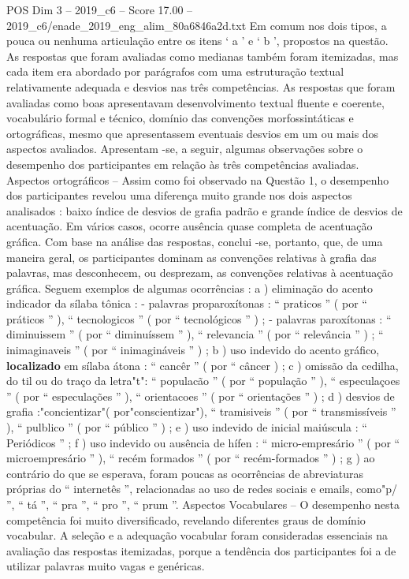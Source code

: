 \begin{textsample}{POS Dim 3 – 2019\_c6 – Score 17.00 – 2019\_c6/enade\_2019\_eng\_alim\_80a6846a2d.txt}
Em comum nos dois tipos, a pouca ou nenhuma articulação entre os itens ‘ a ’ e ‘ b ’, propostos na questão.
As respostas que foram avaliadas como medianas também foram itemizadas, mas cada item era abordado por parágrafos com uma estruturação textual relativamente adequada e desvios nas três competências.
As respostas que foram avaliadas como boas apresentavam desenvolvimento textual fluente e coerente, vocabulário formal e técnico, domínio das convenções morfossintáticas e ortográficas, mesmo que apresentassem eventuais desvios em um ou mais dos aspectos avaliados.
Apresentam -se, a seguir, algumas observações sobre o desempenho dos participantes em relação às três competências avaliadas.
Aspectos ortográficos – Assim como foi observado na Questão 1, o desempenho dos participantes revelou uma diferença muito grande nos dois aspectos analisados : baixo índice de desvios de grafia padrão e grande índice de desvios de acentuação.
Em vários casos, ocorre ausência quase completa de acentuação gráfica.
Com base na análise das respostas, conclui -se, portanto, que, de uma maneira geral, os participantes dominam as convenções relativas à grafia das palavras, mas desconhecem, ou desprezam, as convenções relativas à acentuação gráfica.
Seguem exemplos de algumas ocorrências : a ) eliminação do acento indicador da sílaba tônica : - palavras proparoxítonas : “ praticos ” ( por “ práticos ” ), “ tecnologicos ” ( por “ tecnológicos ” ) ; - palavras paroxítonas : “ diminuissem ” ( por “ diminuíssem ” ), “ relevancia ” ( por “ relevância ” ) ; “ inimaginaveis ” ( por “ inimagináveis ” ) ; b ) uso indevido do acento gráfico, \textbf{localizado} em sílaba átona : “ cancêr ” ( por “ câncer ) ; c ) omissão da cedilha, do til ou do traço da letra"t": “ populacão ” ( por “ população ” ), “ especulaçoes ” ( por “ especulações ” ), “ orientacoes ” ( por “ orientações ” ) ; d ) desvios de grafia :"concientizar"( por"conscientizar"), “ tramisiveis ” ( por “ transmissíveis ” ), “ pulblico ” ( por “ público ” ) ; e ) uso indevido de inicial maiúscula : “ Periódicos ” ; f ) uso indevido ou ausência de hífen : “ micro-empresário ” ( por “ microempresário ” ), “ recém formados ” ( por “ recém-formados ” ) ; g ) ao contrário do que se esperava, foram poucas as ocorrências de abreviaturas próprias do “ internetês ”, relacionadas ao uso de redes sociais e emails, como"p/ ”, “ tá ”, “ pra ”, “ pro ”, “ prum ”.
Aspectos Vocabulares – O desempenho nesta competência foi muito diversificado, revelando diferentes graus de domínio vocabular.
A seleção e a adequação vocabular foram consideradas essenciais na avaliação das respostas itemizadas, porque a tendência dos participantes foi a de utilizar palavras muito vagas e genéricas.

\end{textsample}
